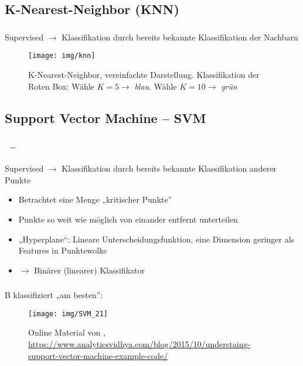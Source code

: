 \subsection{K-Nearest-Neighbor (KNN)}

\begin{frame}
    \frametitle{\insertsubsection}
    Supervised $\rightarrow$ Klassifikation durch bereits bekannte Klassifikation der Nachbarn \cite{datamining2011}
    \begin{figure}[H]
        \centering
        \texttt{[image: img/knn]}
        \caption{K-Nearest-Neighbor, vereinfachte Darstellung. Klassifikation der Roten Box: Wähle $K=5 \rightarrow$ \textit{blau}. Wähle $K=10 \rightarrow$ \textit{grün}\label{fig:knn}}
    \end{figure}
\end{frame}


\subsection{Support Vector Machine -- SVM}

\begin{frame}
    \frametitle{\insertsubsection \ -- \cite{datamining2011}}
    Supervised $\rightarrow$ Klassifikation durch bereits bekannte Klassifikation anderer Punkte 
    \vspace{1em}
    \begin{itemize}
        \setlength\itemsep{0.8em}
        \item Betrachtet eine Menge „kritischer Punkte”
        \item Punkte so weit wie möglich von einander entfernt unterteilen
        \item „Hyperplane“: Lineare Unterscheidungsfunktion, eine Dimension geringer als Features in Punktewolke
        \item $\rightarrow$ Binärer (linearer) Klassifikator
    \end{itemize}
\end{frame}

\begin{frame}
    \frametitle{\insertsubsection}
     B klassifiziert „am besten”:
    \begin{figure}[H]
        \centering
        \texttt{[image: img/SVM\_21]}
        \caption{Online Material von \cite{ray2015}, \url{https://www.analyticsvidhya.com/blog/2015/10/understaing-support-vector-machine-example-code/}\label{fig:svm}}
    \end{figure}
\end{frame}

